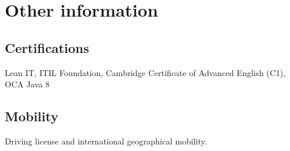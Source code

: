 \documentclass[letterpaper]{twentysecondcv} %
\begin{document}

\section{Other information}
\subsection{Certifications}
Lean IT, ITIL Foundation, Cambridge Certificate of Advanced English (C1), OCA Java 8
\subsection{Mobility}
Driving license and international geographical mobility.







\end{document}
